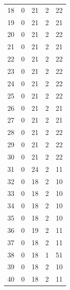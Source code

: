 \documentclass[12pt,a4paper]{report}
\begin{document}
\begin{appendices}
\begin{longtable}{lcccc}
18  &   0 &  21 &   2 &  22 \\
19  &   0 &  21 &   2 &  21 \\
20  &   0 &  21 &   2 &  22 \\
21  &   0 &  21 &   2 &  21 \\
22  &   0 &  21 &   2 &  22 \\
23  &   0 &  21 &   2 &  22 \\
24  &   0 &  21 &   2 &  22 \\
25  &   0 &  21 &   2 &  22 \\
26  &   0 &  21 &   2 &  21 \\
27  &   0 &  21 &   2 &  21 \\
28  &   0 &  21 &   2 &  22 \\
29  &   0 &  21 &   2 &  22 \\
30  &   0 &  21 &   2 &  22 \\
31  &   0 &  24 &   2 &  11 \\
32  &   0 &  18 &   2 &  10 \\
33  &   0 &  18 &   2 &  10 \\
34  &   0 &  18 &   2 &  10 \\
35  &   0 &  18 &   2 &  10 \\
36  &   0 &  19 &   2 &  11 \\
37  &   0 &  18 &   2 &  11 \\
38  &   0 &  18 &   1 &  51 \\
39  &   0 &  18 &   2 &  10 \\
40  &   0 &  18 &   2 &  11 \\
\bottomrule
\end{longtable}


\end{appendices}
\end{document}
